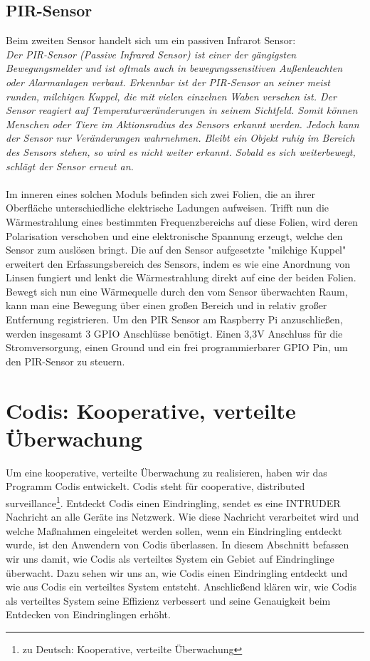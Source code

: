 \documentclass[journal]{IEEEtran}
\begin{document}
\subsection{PIR-Sensor}
Beim zweiten Sensor handelt sich um ein passiven Infrarot Sensor:\\ \textit{Der PIR-Sensor (Passive Infrared Sensor) ist einer der gängigsten Bewegungsmelder und ist oftmals auch in bewegungssensitiven Außenleuchten oder Alarmanlagen verbaut. Erkennbar ist der PIR-Sensor an seiner meist runden, milchigen Kuppel, die mit vielen einzelnen Waben versehen ist. Der Sensor reagiert auf Temperaturveränderungen in seinem Sichtfeld. Somit können Menschen oder Tiere im Aktionsradius des Sensors erkannt werden. Jedoch kann der Sensor nur Veränderungen wahrnehmen. Bleibt ein Objekt ruhig im Bereich des Sensors stehen, so wird es nicht weiter erkannt.  Sobald es sich weiterbewegt, schlägt der Sensor erneut an.}\cite[S. 493]{Raspberry}\\ \\ Im inneren eines solchen Moduls befinden sich zwei Folien, die an ihrer Oberfläche unterschiedliche elektrische Ladungen aufweisen. Trifft nun die Wärmestrahlung eines bestimmten Frequenzbereichs auf diese Folien, wird deren Polarisation verschoben und eine elektronische Spannung erzeugt, welche den Sensor zum auslösen bringt. Die auf den Sensor aufgesetzte "milchige Kuppel" erweitert den Erfassungsbereich des Sensors, indem es wie eine Anordnung von Linsen fungiert und lenkt die Wärmestrahlung direkt auf eine der beiden Folien. Bewegt sich nun eine Wärmequelle durch den vom Sensor überwachten Raum, kann man eine Bewegung über einen großen Bereich und in relativ großer Entfernung registrieren.\cite{pir} Um den PIR Sensor am Raspberry Pi anzuschließen, werden insgesamt 3 GPIO Anschlüsse benötigt. Einen 3,3V Anschluss für die Stromversorgung, einen Ground und ein frei programmierbarer GPIO Pin, um den PIR-Sensor zu steuern.


\section{Codis: Kooperative, verteilte Überwachung}

Um eine kooperative, verteilte Überwachung zu realisieren, haben wir das Programm Codis entwickelt. Codis steht für cooperative, distributed surveillance\footnote{zu Deutsch: Kooperative, verteilte Überwachung}. Entdeckt Codis einen Eindringling, sendet es eine \MakeUppercase{intruder} Nachricht an alle Geräte ins Netzwerk. Wie diese Nachricht verarbeitet wird und welche Maßnahmen eingeleitet werden sollen, wenn ein Eindringling entdeckt wurde, ist den Anwendern von Codis überlassen. In diesem Abschnitt befassen wir uns damit, wie Codis als verteiltes System ein Gebiet auf Eindringlinge überwacht. Dazu sehen wir uns an, wie Codis einen Eindringling entdeckt und wie aus Codis ein verteiltes System entsteht. Anschließend  klären wir, wie Codis als verteiltes System seine Effizienz verbessert und seine Genauigkeit beim Entdecken von Eindringlingen erhöht.
\end{document}
